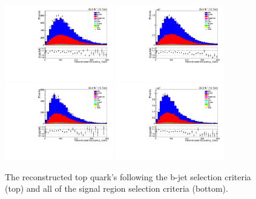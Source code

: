 \begin{figure}[ht]
\centering
\includegraphics[width=0.42\textwidth]{figs/background-estimation/plots/unblinded/prompt_ee_ttbarInc/topPt_NPL_ee_bTag_ee.pdf}
\includegraphics[width=0.42\textwidth]{figs/background-estimation/plots/unblinded/prompt_mumu_ttbarInc/topPt_NPL_mumu_bTag_mumu.pdf}
\\
\includegraphics[width=0.42\textwidth]{figs/background-estimation/plots/unblinded/prompt_ee_ttbarInc/topPt_NPL_ee_wMass_ee.pdf}
\includegraphics[width=0.42\textwidth]{figs/background-estimation/plots/unblinded/prompt_mumu_ttbarInc/topPt_NPL_mumu_wMass_mumu.pdf}
\caption{
The reconstructed top quark's \pT following the b-jet selection criteria (top) and all of the signal region selection criteria (bottom).
}
\label{fig:App_SR_topPt}
\end{figure}

